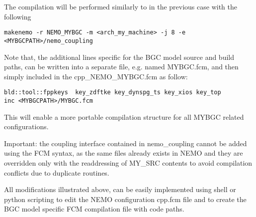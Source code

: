 \documentclass[../main/TOP_manual]{subfiles}
\begin{document}
The compilation will be performed similarly to in the previous case with the following

\begin{verbatim}
makenemo -r NEMO_MYBGC -m <arch_my_machine> -j 8 -e <MYBGCPATH>/nemo_coupling
\end{verbatim}

Note that, the additional lines specific for the BGC model source and build paths, can be written into a separate file, e.g. named MYBGC.fcm, and then simply included in the cpp\_NEMO\_MYBGC.fcm as follow:

\begin{verbatim}
bld::tool::fppkeys  key_zdftke key_dynspg_ts key_xios key_top
inc <MYBGCPATH>/MYBGC.fcm
\end{verbatim}

This will enable a more portable compilation structure for all MYBGC related configurations.

Important: the coupling interface contained in nemo\_coupling cannot be added using the FCM syntax, as the same files already exists in NEMO and they are overridden only with the readdressing of MY\_SRC contents to avoid compilation conflicts due to duplicate routines.

All modifications illustrated above, can be easily implemented using shell or python scripting to edit the NEMO configuration cpp.fcm file and to create the BGC model specific FCM compilation file with code paths.
\end{document}
